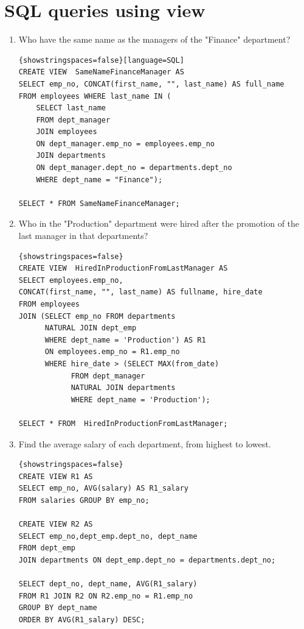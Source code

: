 \documentclass{article}
\begin{document}
\section*{SQL queries using view}
\begin{enumerate}
	\item Who have the same name as the managers of the "Finance" department?\\
	\begin{lstlisting}{showstringspaces=false}[language=SQL]
CREATE VIEW  SameNameFinanceManager AS
SELECT emp_no, CONCAT(first_name, "", last_name) AS full_name 
FROM employees WHERE last_name IN (
	SELECT last_name 
    FROM dept_manager 
    JOIN employees 
    ON dept_manager.emp_no = employees.emp_no
    JOIN departments 
    ON dept_manager.dept_no = departments.dept_no
	WHERE dept_name = "Finance");

SELECT * FROM SameNameFinanceManager;
	\end{lstlisting}
	
	\item Who in the "Production" department were hired after the promotion of the last manager in that departments?\\
	\begin{lstlisting}{showstringspaces=false}
CREATE VIEW  HiredInProductionFromLastManager AS
SELECT employees.emp_no,
CONCAT(first_name, "", last_name) AS fullname, hire_date
FROM employees 
JOIN (SELECT emp_no FROM departments 
	  NATURAL JOIN dept_emp
	  WHERE dept_name = 'Production') AS R1
	  ON employees.emp_no = R1.emp_no
	  WHERE hire_date > (SELECT MAX(from_date)
	  		FROM dept_manager 
	  		NATURAL JOIN departments
			WHERE dept_name = 'Production');
			
SELECT * FROM  HiredInProductionFromLastManager;
	\end{lstlisting}
	
	\item Find the average salary of each department, from highest to lowest.	
	\begin{lstlisting}{showstringspaces=false}
CREATE VIEW R1 AS
SELECT emp_no, AVG(salary) AS R1_salary 
FROM salaries GROUP BY emp_no;

CREATE VIEW R2 AS
SELECT emp_no,dept_emp.dept_no, dept_name 
FROM dept_emp 
JOIN departments ON dept_emp.dept_no = departments.dept_no;
 
SELECT dept_no, dept_name, AVG(R1_salary)
FROM R1 JOIN R2 ON R2.emp_no = R1.emp_no
GROUP BY dept_name 
ORDER BY AVG(R1_salary) DESC;
	\end{lstlisting}
	

\end{enumerate}
\end{document}
